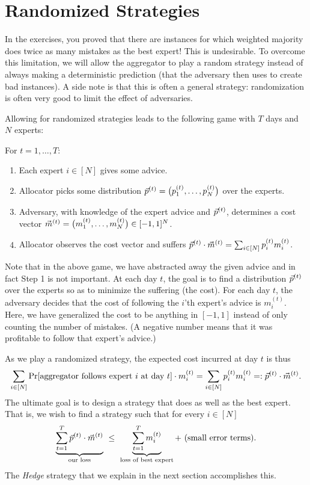 \section{Randomized Strategies}

In the exercises, you proved that there are instances for which weighted majority does twice as many
mistakes as the best expert! This is undesirable. To overcome this limitation, we will allow the
aggregator to play a random strategy instead of always making a deterministic prediction (that the
adversary then uses to create bad instances). A side note is that this is often a general strategy:
randomization is often very good to limit the effect of adversaries.

Allowing for randomized strategies leads to the following game with $T$ days and $N$ experts:

\medskip
\noindent For $t=1,\ldots,T$:
\begin{enumerate}
  \item Each expert $i\in[N]$ gives some advice.
  \item Allocator picks some distribution $\vec{p}^{(t)}=\big(p_1^{(t)},\ldots,p_N^{(t)}\big)$ over the
    experts.
  \item Adversary, with knowledge of the expert advice and $\vec{p}^{(t)}$, determines a cost vector
    $\vec{m}^{(t)}=\big(m_1^{(t)},\ldots,m_N^{(t)}\big)\in[-1,1]^N$.
  \item Allocator observes the cost vector and suffers
    $\vec{p}^{(t)}\cdot\vec{m}^{(t)}=\sum_{i\in[N]}p_i^{(t)}m_i^{(t)}$.
\end{enumerate}

Note that in the above game, we have abstracted away the given advice and in fact Step 1 is not
important. At each day $t$, the goal is to find a distribution $\vec{p}^{(t)}$ over the experts so as to
minimize the suffering (the cost). For each day $t$, the adversary decides that the cost of
following the $i$'th expert's advice is $m_i^{(t)}$. Here, we have generalized the cost to be
anything in $[-1,1]$ instead of only counting the number of mistakes. (A negative number means that
it was profitable to follow that expert's advice.)

As we play a randomized strategy, the expected cost incurred at day $t$ is thus
\[
  \sum_{i\in[N]}\Pr[\text{aggregator follows expert } i \text{ at day } t]\cdot m_i^{(t)}
  =\sum_{i\in[N]}p_i^{(t)}m_i^{(t)}=:\vec{p}^{(t)}\cdot\vec{m}^{(t)}.
\]
The ultimate goal is to design a strategy that does as well as the best expert. That is, we wish to
find a strategy such that for every $i\in[N]$
\[
  \underbrace{\sum_{t=1}^T\vec{p}^{(t)}\cdot\vec{m}^{(t)}}_{\text{our loss}}
  \ \le\ \underbrace{\sum_{t=1}^T m_i^{(t)}}_{\text{loss of best expert}}
  +\ \text{(small error terms)}.
\]
The \emph{Hedge} strategy that we explain in the next section accomplishes this.

